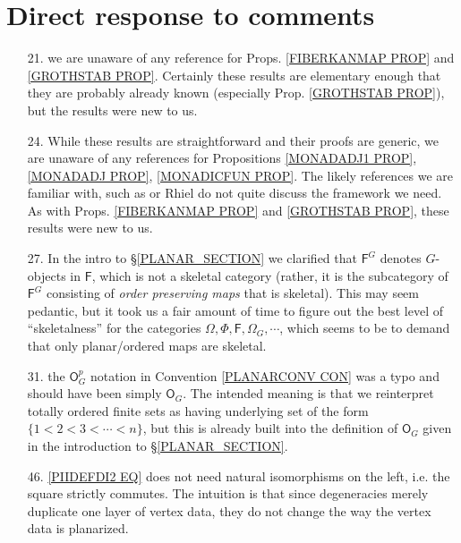 \documentclass{article}
\begin{document}
\section{Direct response to comments}

\begin{itemize}
	\item[21.] we are unaware of any reference for Props. 
	\ref{FIBERKANMAP PROP} and \ref{GROTHSTAB PROP}.
	Certainly these results are elementary enough that they are probably already known (especially Prop. \ref{GROTHSTAB PROP}),
	but the results were new to us. 
	
	\item[24.] While these results are straightforward 
	and their proofs are generic, 
	we are unaware of any references for Propositions \ref{MONADADJ1 PROP}, \ref{MONADADJ PROP}, \ref{MONADICFUN PROP}. The likely references we are familiar with, such as 
	\cite{Bo94} or {\color{red} Rhiel} do not quite discuss the framework we need.
	As with Props. 
	\ref{FIBERKANMAP PROP} and \ref{GROTHSTAB PROP},
	these results were new to us.
	
	\item[27.] In the intro to \S \ref{PLANAR_SECTION} we
	clarified that $\mathsf{F}^G$ denotes $G$-objects in $\mathsf{F}$,
	which is not a skeletal category (rather, it is the subcategory of $\mathsf{F}^G$ consisting of \emph{order preserving maps} that is skeletal).
	This may seem pedantic,
	but it took us a fair amount of time to figure out the best level of ``skeletalness'' for the categories 
	$\Omega, \Phi, \mathsf{F}, \Omega_G, \cdots$, 
	which seems to be to demand that only planar/ordered maps are skeletal.
	
	\item[31.] the $\mathsf{O}^p_G$ notation in 
	Convention \ref{PLANARCONV CON}
	was a typo and should have been simply $\mathsf{O}_G$.
	The intended meaning is that we reinterpret totally ordered finite sets as having underlying set of the form
	$\{1<2<3<\cdots <n\}$,
	but this is already built into the definition of 
	$\mathsf{O}_G$ given in the introduction to
	\S \ref{PLANAR_SECTION}.
	
	\item[46.] \eqref{PIIDEFDI2 EQ} does not need natural isomorphisms on the left, i.e. the square strictly commutes. The intuition is that since degeneracies merely duplicate one layer of vertex data, they do not change the way the vertex data is planarized. 
	

\end{itemize}
\end{document}
